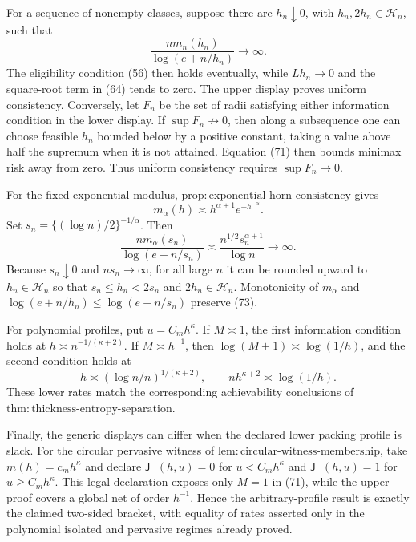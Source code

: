 For a sequence of nonempty classes, suppose there are \(h_n\downarrow0\),
with \(h_n,2h_n\in\mathcal H_n\), such that
\[
 \frac{nm_n(h_n)}{\log(e+n/h_n)}\longrightarrow\infty. \tag{72}
\]
The eligibility condition (56) then holds eventually, while
\(Lh_n\to0\) and the square-root term in (64) tends to zero.  The upper
display proves uniform consistency.  Conversely, let \(F_n\) be the set
of radii satisfying either information condition in the lower display.
If \(\sup F_n\not\to0\), then along a subsequence one can choose feasible
\(h_n\) bounded below by a positive constant, taking a value above half
the supremum when it is not attained.  Equation (71) then bounds minimax
risk away from zero.  Thus uniform consistency requires
\(\sup F_n\to0\).

For the fixed exponential modulus,
\(\mathrm{prop:exponential\text{-}horn\text{-}consistency}\) gives
\[
 m_\alpha(h)\asymp h^{\alpha+1}e^{-h^{-\alpha}}.
\]
Set \(s_n=\{(\log n)/2\}^{-1/\alpha}\).  Then
\[
 \frac{nm_\alpha(s_n)}{\log(e+n/s_n)}
 \asymp\frac{n^{1/2}s_n^{\alpha+1}}{\log n}
 \longrightarrow\infty. \tag{73}
\]
Because \(s_n\downarrow0\) and \(ns_n\to\infty\), for all large \(n\)
it can be rounded upward to \(h_n\in\mathcal H_n\) so that
\(s_n\le h_n<2s_n\) and \(2h_n\in\mathcal H_n\).  Monotonicity of
\(m_\alpha\) and
\(\log(e+n/h_n)\le\log(e+n/s_n)\) preserve (73).

For polynomial profiles, put \(u=C_mh^\kappa\).  If \(M\asymp1\), the
first information condition holds at
\(h\asymp n^{-1/(\kappa+2)}\).  If \(M\asymp h^{-1}\), then
\(\log(M+1)\asymp\log(1/h)\), and the second condition holds at
\[
 h\asymp(\log n/n)^{1/(\kappa+2)},
 \qquad nh^{\kappa+2}\asymp\log(1/h).
\]
These lower rates match the corresponding achievability conclusions of
\(\mathrm{thm:thickness\text{-}entropy\text{-}separation}\).

Finally, the generic displays can differ when the declared lower packing
profile is slack.  For the circular pervasive witness of
\(\mathrm{lem:circular\text{-}witness\text{-}membership}\), take
\(m(h)=c_mh^\kappa\) and declare \(\mathsf J_{-}(h,u)=0\) for
\(u<C_mh^\kappa\) and \(\mathsf J_{-}(h,u)=1\) for
\(u\ge C_mh^\kappa\).  This legal declaration exposes only \(M=1\) in
(71), while the upper proof covers a global net of order \(h^{-1}\).
Hence the arbitrary-profile result is exactly the claimed two-sided
bracket, with equality of rates asserted only in the polynomial isolated
and pervasive regimes already proved.


